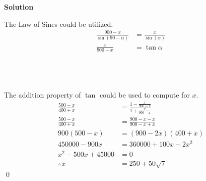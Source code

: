 \documentclass{article}
\newenvironment{solution}{\begin{trivlist}\item[]{\bf Solution}}{\qed \end{trivlist}}
\begin{document}
\begin{solution}
\begin{minipage}{0.5\textwidth}
\begin{center}
\end{center}
\end{minipage}
\begin{minipage}{0.5\textwidth}
The Law of Sines could be utilized.
\begin{align*}
    \frac{900 - x}{\sin(90 - \alpha)} &= \frac{x}{\sin(\alpha)} \\
    \frac{x}{900 - x} &= \tan\alpha
\end{align*}
\end{minipage}
\\\\\\
The addition property of $\tan$ could be used to compute for $x$.
\begin{align*}
    \frac{500 - x}{400 + x} &= \frac{1 - \frac{x}{900 - x}}{1 + \frac{x}{900 - x}} \\
    \frac{500 - x}{400 + x} &= \frac{900 - x - x}{900 - x + x} \\
    900(500 - x) &= (900 - 2x)(400 + x) \\
    450000 - 900x &= 360000 + 100x - 2x^2 \\
    x^2 - 500x + 45000 &= 0 \\
    \therefore x &= \boxed{250 + 50\sqrt{7}}
\end{align*}
\end{solution}

\newpage
\end{document}

